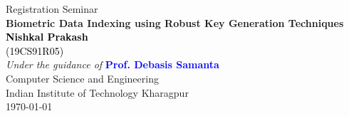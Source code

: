 \centering
\scriptsize{Registration Seminar}\\
\vspace{0.2cm}
\textcolor{navy_theme}{\Large\textbf{Biometric Data Indexing using Robust Key Generation Techniques}}\\
\vspace{0.5cm}
\normalsize{\textbf{\textcolor{black}{Nishkal Prakash}}}\\\textcolor{black}{\footnotesize{(19CS91R05)}}\\
\vspace{0.3cm}
\textit{\scriptsize{\textcolor{navy_theme}{Under the guidance of}}}
\newline
\normalsize{\textbf{\textcolor{blue}{Prof. Debasis Samanta}}}\\
\vspace{0.3cm}
\newline
\small{\textcolor{navy_theme}{Computer Science and Engineering}}\\
\small{\textcolor{navy_theme}{Indian Institute of Technology Kharagpur}}\\
\vspace{0.4cm}
\scriptsize{\today}